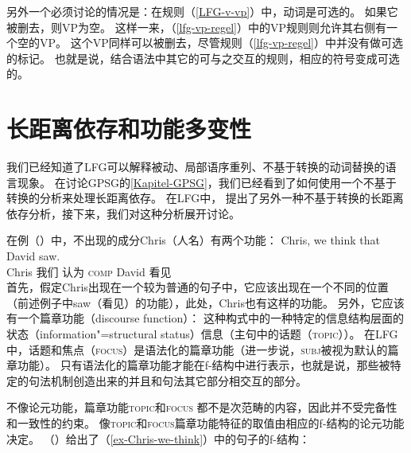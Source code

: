 另外一个必须讨论的情况是：在规则（\ref{LFG-v-vp}）中，动词是可选的。
如果它被删去，则VP为空。
这样一来，（\ref{lfg-vp-regel}）中的VP规则则允许其右侧有一个空的VP。
这个VP同样可以被删去，尽管规则（\ref{lfg-vp-regel}）中并没有做可选的标记。
也就是说，结合语法中其它的可与之交互的规则，相应的符号变成可选的。  

\section{长距离依存和功能多变性}
\label{Abschnitt-NLA-LFG}

我们已经知道了LFG可以解释被动、局部语序重列、不基于转换的动词替换的语言现象。
在讨论GPSG的\ref{Kapitel-GPSG}，我们已经看到了如何使用一个不基于转换的分析来处理长距离依存。
在LFG中， \citet{KZ89a}提出了另外一种不基于转换的长距离依存分析，接下来，我们对这种分析展开讨论。

在例（）中，不出现的成分Chris（人名）有两个功能：
\ea
\label{ex-Chris-we-think}
\gll Chris, we think that David saw.\\
Chris 我们 认为 \textsc{comp} David  看见\\
\z
首先，假定Chris出现在一个较为普通的句子中，它应该出现在一个不同的位置（前述例子中saw（看见）的\lfgobj 功能），此处，Chris也有这样的功能。
另外，它应该有一个篇章功能（discourse function）：
这种构式中的一种特定的信息结构层面的状态（information"=structural status）信息（主句中的话题（\textsc{topic}））。
在LFG中，话题和焦点（\textsc{focus}）是语法化的篇章功能（进一步说，\textsc{subj}被视为默认的篇章功能）。
只有语法化的篇章功能才能在f-结构中进行表示，也就是说，那些被特定的句法机制创造出来的并且和句法其它部分相交互的部分。

不像论元功能，篇章功能\textsc{topic}和\textsc{focus}
都不是次范畴的内容，因此并不受完备性和一致性的约束。
像\textsc{topic}和\textsc{focus}篇章功能特征的取值由相应的f-结构的论元功能决定。
（）给出了（\ref{ex-Chris-we-think}）中的句子的f-结构：

\ea
{}
\z

